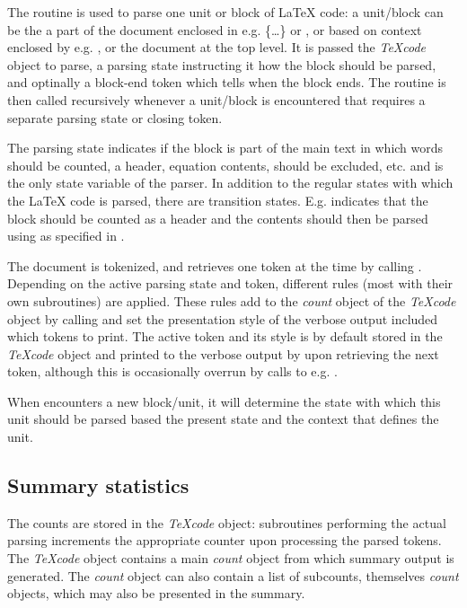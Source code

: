 \documentclass{article}
\newcommand\Obj[1]{\textsl{#1}}
\begin{document}
The  routine is used to parse one unit or block of \LaTeX{} code: a unit/block can be the a part of the document enclosed in e.g. \{\ldots\} or , or based on context enclosed by e.g. \code{[\ldots]}, or the document at the top level. It is passed the \Obj{TeXcode} object to parse, a parsing state instructing it how the block should be parsed, and optinally a block-end token which tells  when the block ends. The  routine is then called recursively whenever a unit/block is encountered that requires a separate parsing state or closing token.

The parsing state indicates if the block is part of the main text in which words should be counted, a header, equation contents, should be excluded, etc. and is the only state variable of the parser. In addition to the regular states with which the \LaTeX{} code is parsed, there are transition states. E.g.  indicates that the block should be counted as a header and the contents should then be parsed using  as specified in .

The document is tokenized, and  retrieves one token at the time by calling . Depending on the active parsing state and token, different rules (most with their own subroutines) are applied. These rules add to the \Obj{count} object of the \Obj{TeXcode} object by calling  and set the presentation style of the verbose output included which tokens to print. The active token and its style is by default stored in the \Obj{TeXcode} object and printed to the verbose output by  upon retrieving the next token, although this is occasionally overrun by calls to e.g. .

When  encounters a new block/unit, it will determine the state with which this unit should be parsed based the present state and the context that defines the unit.


\subsection{Summary statistics}

The counts are stored in the \Obj{TeXcode} object: subroutines performing the actual parsing increments the appropriate counter upon processing the parsed tokens. The \Obj{TeXcode} object contains a main \Obj{count} object from which summary output is generated. The \Obj{count} object can also contain a list of subcounts, themselves \Obj{count} objects, which may also be presented in the summary.
\end{document}
